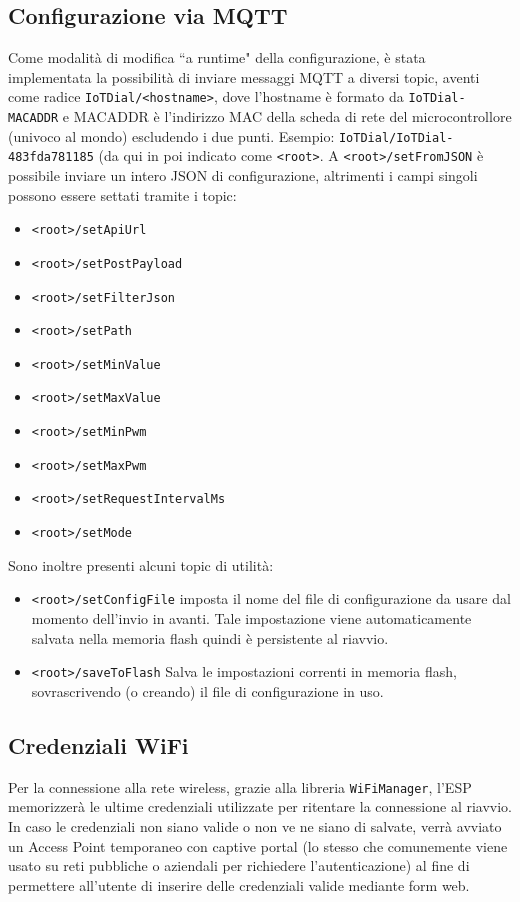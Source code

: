\documentclass[12pt,a4paper]{report}
\begin{document}
\subsection{Configurazione via MQTT}
Come modalità di modifica ``a runtime" della configurazione, è stata implementata la possibilità di inviare messaggi MQTT a diversi
topic, aventi come radice \texttt{IoTDial/<hostname>}, dove l'hostname è formato da \texttt{IoTDial-MACADDR} e MACADDR è
l'indirizzo MAC della scheda di rete del microcontrollore (univoco al mondo) escludendo i due punti. Esempio: 
\texttt{IoTDial/IoTDial-483fda781185} (da qui in poi indicato come \texttt{<root>}.
A \texttt{<root>/setFromJSON} è possibile inviare un intero JSON di configurazione, altrimenti i campi singoli possono essere
settati tramite i topic:
\begin{itemize}
  \item \texttt{<root>/setApiUrl}
  \item \texttt{<root>/setPostPayload}
  \item \texttt{<root>/setFilterJson}
  \item \texttt{<root>/setPath}
  \item \texttt{<root>/setMinValue}
  \item \texttt{<root>/setMaxValue}
  \item \texttt{<root>/setMinPwm}
  \item \texttt{<root>/setMaxPwm}
  \item \texttt{<root>/setRequestIntervalMs}
  \item \texttt{<root>/setMode}
\end{itemize}
\noindent Sono inoltre presenti alcuni topic di utilità:
\begin{itemize}
  \item \texttt{<root>/setConfigFile} imposta il nome del file di configurazione da usare dal momento dell'invio in avanti. Tale
		impostazione viene automaticamente salvata nella memoria flash quindi è persistente al riavvio.
  \item \texttt{<root>/saveToFlash} Salva le impostazioni correnti in memoria flash, sovrascrivendo (o creando) il file di configurazione
		in uso.
\end{itemize}

\subsection{Credenziali WiFi}
Per la connessione alla rete wireless, grazie alla libreria \texttt{WiFiManager}, l'ESP memorizzerà le ultime credenziali utilizzate
per ritentare la connessione al riavvio. In caso le credenziali non siano valide o non ve ne siano di salvate, verrà avviato un
Access Point temporaneo con captive portal (lo stesso che comunemente viene usato su reti pubbliche o aziendali per richiedere
l'autenticazione) al fine di permettere all'utente di inserire delle credenziali valide mediante form web.
\end{document}
